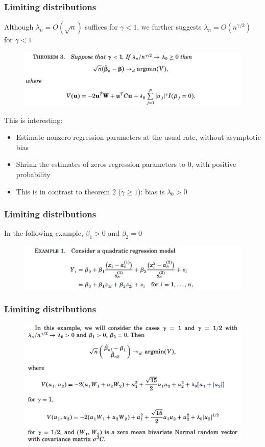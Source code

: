 \documentclass{beamer}
\begin{document}
	\begin{frame}
		\frametitle{Limiting distributions}
		Although $\lambda_n = O(\sqrt{n})$ suffices for $\gamma < 1$, we further suggests $\lambda_n = O(n^{\gamma/2})$ for $\gamma < 1$
		\begin{figure}
			\includegraphics[width=1\linewidth]{image003.png}
		\end{figure}
		This is interesting:
		\begin{itemize}
			\item 
			Estimate nonzero regression parameters at the usual rate, without asymptotic bias
			\item
			Shrink the estimates of  zeros regression parameters to 0, with positive probability
			\item
			This is in contrast to theorem 2 ($\gamma \geq 1$): bias is $\lambda_0 > 0$
		\end{itemize}
	\end{frame}
	
	\begin{frame}
		\frametitle{Limiting distributions}
		In the following example, $\beta_1 > 0$ and $\beta_2 = 0$
		\begin{figure}
			\includegraphics[width=1\linewidth]{image004.png}
		\end{figure}
	\end{frame}
	
	\begin{frame}
		\frametitle{Limiting distributions}
		\begin{figure}
			\includegraphics[width=1\linewidth]{image005.png}
		\end{figure}
	\end{frame}
	
\end{document}

